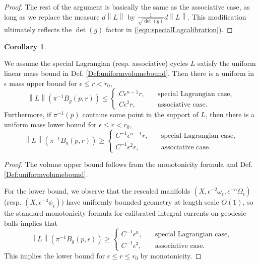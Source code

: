 \documentclass{article}
\theoremstyle{definition}
\newtheorem{cor}[thm]{Corollary}
\newcommand{\norm}[1]{\left\lVert#1\right\rVert}
\begin{document}
\begin{proof}
		The rest of the argument is basically the same as the associative case, as long as we replace the measure $d\norm{L}$ by $\frac{1}{ \sqrt{\det(g)}  } d\norm{L}$. This modification ultimately reflects the $\det(g)$ factor in (\ref{eqn:specialLagcalibration}).
				\end{proof}
				
				
		
				
				
				
	
				
				
				
		\begin{cor}\label{cor:volumebound}
		
We assume the special Lagrangian (resp. associative) cycles $L$ satisfy the uniform linear mass bound in Def. \ref{Def:uniformvolumebound}. Then there is a uniform in $\epsilon$ mass upper bound for $\epsilon\leq r<r_0$,
		\[
		\norm{L}( \pi^{-1}B_g(p, r) ) \leq \begin{cases}
			C\epsilon^{n-1}r ,\quad &\text{special Lagrangian case},
			\\
		C	\epsilon^2 r,\quad  & \text{associative case}.
		\end{cases}
		\]
		Furthermore, if $\pi^{-1}(p)$ contains some point in the support of $L$, then there is a uniform mass lower bound for $\epsilon\leq r<r_0$,
		\[
		\norm{L}( \pi^{-1}B_g(p, r) ) \geq \begin{cases}
			C^{-1}\epsilon^{n-1} r ,\quad &\text{special Lagrangian case},
			\\
			C^{-1}	\epsilon^2r ,\quad  & \text{associative case}.
		\end{cases}
		\]
		\end{cor}
				
				
				
				
				
			\begin{proof}
			The volume upper bound follows from the monotonicity formula and Def. \ref{Def:uniformvolumebound}. 
			
			For the lower bound, we observe that the rescaled manifolds $(X, \epsilon^{-2} \omega_\epsilon, \epsilon^{-n}\Omega_\epsilon )$ (resp. $(X, \epsilon^{-3}\phi_\epsilon))$ have uniformly bounded geometry at length scale $O(1)$, so the standard monotonicity formula for calibrated integral currents on geodesic balls implies that
			\[
				\norm{L}( \pi^{-1}B_g(p, \epsilon ) ) \geq \begin{cases}
					C^{-1}\epsilon^n  ,\quad &\text{special Lagrangian case},
					\\
					C^{-1}	\epsilon^3   ,\quad  & \text{associative case}.
					\end{cases}
			\]
			This implies the lower bound for $\epsilon\leq r\leq r_0$ by monotonicity.
			\end{proof}
				
\end{document}
